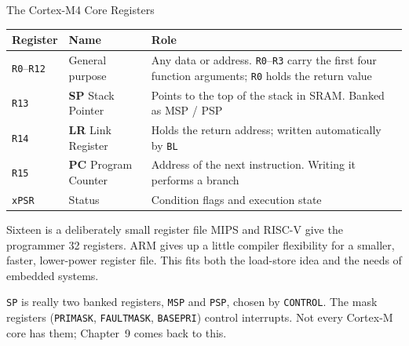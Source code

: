 \documentclass[9pt,aspectratio=169,xcolor=table]{beamer}
\begin{document}
\begin{frame}{The Cortex-M4 Core Registers}
	\begin{center}
		{\small
			\striped
			\begin{tabular}{@{}l l R{.52\textwidth}@{}}
				\toprule
				\textbf{Register} & \textbf{Name} & \textbf{Role} \\
				\midrule
				\texttt{R0}--\texttt{R12} & General purpose
				& Any data or address. \texttt{R0}--\texttt{R3} carry the first four
				function arguments; \texttt{R0} holds the return value \\
				\texttt{R13} & \textbf{SP} Stack Pointer
				& Points to the top of the stack in SRAM. Banked as MSP / PSP \\
				\texttt{R14} & \textbf{LR} Link Register
				& Holds the return address; written automatically by \texttt{BL} \\
				\texttt{R15} & \textbf{PC} Program Counter
				& Address of the next instruction. Writing it performs a branch \\
				\midrule
				\texttt{xPSR} & Status & Condition flags and execution state \\
				\bottomrule
		\end{tabular}}
	\end{center}
	\vspace{2mm}
	\begin{block}{Sixteen is a deliberately small register file}
		MIPS and RISC-V give the programmer 32 registers. ARM gives up a little compiler flexibility for a smaller, faster, lower-power register file. This fits both the load-store idea and the needs of embedded systems.
	\end{block}
	\vspace{1mm}
	{\small \texttt{SP} is really two banked registers, \texttt{MSP} and \texttt{PSP}, chosen by \texttt{CONTROL}. The mask registers (\texttt{PRIMASK}, \texttt{FAULTMASK}, \texttt{BASEPRI}) control interrupts. Not every Cortex-M core has them; Chapter~9 comes back to this.}
\end{frame}
\end{document}
